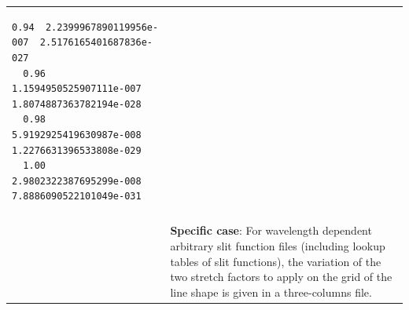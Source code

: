 \begin{minipage}[t]{\textwidth}
\begin{tabular}[h]{l p{9cm}}
\begin{minipage}[t]{\textwidth}
\begin{Verbatim}[fontfamily=courier,fontsize=\relsize{-2}]
  0.94  2.2399967890119956e-007  2.5176165401687836e-027
  0.96  1.1594950525907111e-007  1.8074887363782194e-028
  0.98  5.9192925419630987e-008  1.2276631396533808e-029
  1.00  2.9802322387695299e-008  7.8886090522101049e-031
\end{Verbatim}
\end{minipage}   \\
&   \\ [6pt]
& \textbf{Specific case}: For wavelength dependent arbitrary slit function files (including lookup tables of slit functions), the variation of the two stretch factors to apply on the grid of the line shape is given in a three-columns file. \\ [6pt]
\end{tabular}
\end{minipage}

